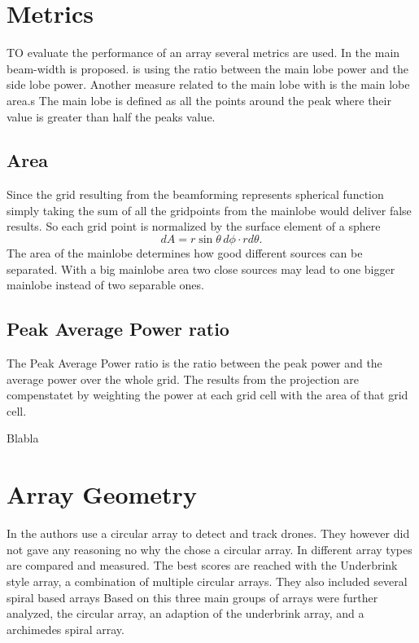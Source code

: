 \section{Metrics}
TO evaluate the performance of an array several metrics are used.
In  the
main beam-width is proposed.
 is using the ratio
between the main lobe power and the side lobe power.
Another measure related to the main lobe with is the main lobe area.s
The main lobe is defined as all the points around the peak where their value
is greater than half the peaks value. 

\subsection{Area}
Since the grid resulting from the beamforming represents spherical function
simply taking the sum of all the gridpoints from the mainlobe
would deliver false results.
So each grid point is normalized by the surface element of a sphere
\begin{equation}
	dA = r \sin\theta \, d\phi \cdot r d\theta.
\end{equation}
The area of the mainlobe determines how good different sources can be separated.
With a big mainlobe area two close sources may lead to one bigger mainlobe instead
of two separable ones.
\subsection{Peak Average Power ratio}
The Peak Average Power ratio is the ratio between the peak power and
the average power over the whole grid.
The results from the projection are compenstatet by weighting
the power at each grid cell with the area of that grid cell.


Blabla
\section{Array Geometry}
In  the authors use a circular array to detect and track drones.
They however did not gave any reasoning no why the chose a circular array.
\cite{bandkProducts}
In \cite{arr1} different array types are compared and measured.
The best scores are reached with the Underbrink style array, a combination
of multiple circular arrays.
They also included several spiral based arrays
Based on this three main groups of arrays were further analyzed,
the circular array, an adaption of the underbrink array, and a archimedes
spiral array.
